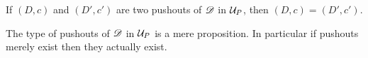 \documentclass[hott-all.tex]{subfiles}
\begin{document}
% 
% 
\begin{lem}
  If $(D,c)$ and $(D',c')$ are two pushouts of $\Ddiag$ in $\P$, then
  $(D,c)=(D',c')$.
\end{lem}
% 
% 
% 
% 
\begin{cor}
  The type of pushouts of $\Ddiag$ in $\P$ is a mere proposition. In particular if
  pushouts merely exist then they actually exist.
\end{cor}
% 
\end{document}

